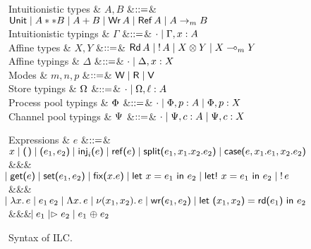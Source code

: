 \begin{figure*}[t]
  \begin{grammar}
    Intuitionistic types
    & $A,B$
    &$\mathrel{::=}$& $\text{\textsf{Unit}} \mathrel{\mid} {A} ** {B} \mathrel{\mid} {A} + {B} \mathrel{\mid}
    \text{\textsf{Wr}}\,A \mathrel{\mid} \text{\textsf{Ref}}\,A \mathrel{\mid} {A}\rightarrow_{\footnotesize m}{B}$
    \\
    Intuitionistic typings
    & $\Gamma$
    &$\mathrel{::=}$& $\cdot \mathrel{\mid} \Gamma,x:A$
    \\
    Affine types
    & $X,Y$
    &$\mathrel{::=}$& $\text{\textsf{Rd}}\,A \mathrel{\mid} {!}\,{A} \mathrel{\mid} {X}\otimes{Y} \mathrel{\mid}
    {X}\multimap_{\footnotesize m}{Y}$
    \\
    Affine typings
    & $\Delta$
    &$\mathrel{::=}$& $\cdot \mathrel{\mid} \Delta,x:X$
    \\
    Modes & $m,n,p$ &$\mathrel{::=}$& $\textsf{W} \mathrel{\mid} \textsf{R} \mathrel{\mid} \textsf{V}$    
    \\[2mm]
    Store typings
    & $\Omega$
    &$\mathrel{::=}$& $\cdot \mathrel{\mid} \Omega,\ell:A$
    \\
    Process pool typings
    & $\Phi$
    &$\mathrel{::=}$& $\cdot \mathrel{\mid} \Phi,p:A \mathrel{\mid} \Phi,p:X$
    \\
    Channel pool typings
    & $\Psi$
    &$\mathrel{::=}$& $\cdot \mathrel{\mid} \Psi,c:A \mathrel{\mid} \Psi,c:X$
  \end{grammar}
  \begin{grammar}
    Expressions
    & $e$
        &$\mathrel{::=}$&
        $\eVar{x} \bnfalt \eUnit \bnfalt \ePair{e_1}{e_2} \bnfalt \eInj{i}{e}
    \bnfalt \eRef{e} \bnfalt \eSplit{e_1}{x_1}{x_2}{e_2} \bnfalt
    \eCase{e}{x_1}{e_1}{x_2}{e_2}$
    \\ &&& $\hspace{-1.02ex}\mathrel{\mid} \text{\textsf{get}}\textsf{(}{e}\textsf{)} \mathrel{\mid} \text{\textsf{set}}\textsf{(}{e_1},{e_2}\textsf{)} \mathrel{\mid} \text{\textsf{fix}}\textsf{(}{x}.{e}\textsf{)}
    \mathrel{\mid} \text{\textsf{let}}\ {x} = {e_1}\ \text{\textsf{in}}\ {e_2} \mathrel{\mid} \text{\textsf{let!}}\ {x} = {e_1}\ \text{\textsf{in}}\ {e_2} \mathrel{\mid} {!}\,{e}$
    \\ &&& $\hspace{-1.02ex}\mathrel{\mid} \lambda{x}.\,{e} \mathrel{\mid} e_1\,e_2 \mathrel{\mid} \Lambda{x}.\,{e} \mathrel{\mid} \nu(x_1,
      x_2).\,e \mathrel{\mid} \text{\textsf{wr}}\textsf{(}{e_1},{e_2}\textsf{)} \mathrel{\mid} \text{\textsf{let}}\ {\textsf{(}{x_1},{x_2}\textsf{)}} = {\text{\textsf{rd}}\textsf{(}{e_1}\textsf{)}}\ \text{\textsf{in}}\ {{e_2}}$
    \\ &&& $\hspace{-1.02ex}\mathrel{\mid} e_1 \mathrel{|\rhd} e_2 \mathrel{\mid} e_1 \mathrel{\oplus} e_2$
  \end{grammar}
  \caption{Syntax of ILC. }
  \label{fig:ilc-syntax}
\end{figure*}
